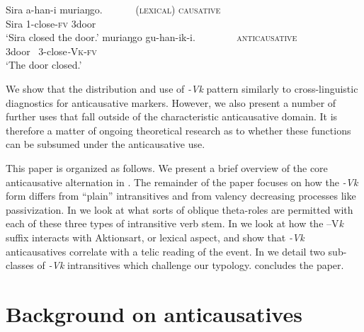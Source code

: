 \documentclass[output=paper]{langsci/lanmgscibook}
\begin{document}
\gll  Sira a-han-i       muriaŋgo.~ ~ ~ ~     \textsc{(lexical) causative}\\
       Sira 1-close-\textsc{fv} 3door\\
\glt ‘Sira closed the door.’
\ex\label{ex:gluckman:2b}
\gll  muriaŋgo gu-han-ik-i.~ ~ ~ ~ ~     \textsc{anticausative}\\
       3door ~3-close\textit{-}\textsc{Vk}-\textsc{fv}\\
\glt ‘The door closed.’
\z
\z

We show that the distribution and use of \textit{-Vk} pattern similarly to cross-linguistic diagnostics for anticausative markers. However, we also present a number of further uses that fall outside of the characteristic anticausative domain. It is therefore a matter of ongoing theoretical research as to whether these functions can be subsumed under the anticausative use.
 
This paper is organized as follows. We present a brief overview of the core anticausative alternation in . The remainder of the paper focuses on how the \textit{-Vk} form differs from “plain” intransitives and from valency decreasing processes like passivization. In  we look at what sorts of oblique theta-roles are permitted with each of these three types of intransitive verb stem. In  we look at how the –V\textit{k} suffix interacts with Aktionsart, or lexical aspect, and show that \textit{-Vk} anticausatives correlate with a telic reading of the event. In  we detail two sub-classes of \textit{-Vk} intransitives which challenge our typology.  concludes the paper. 

\section{Background on anticausatives}\label{sec:gluckman:2}
\end{document}
